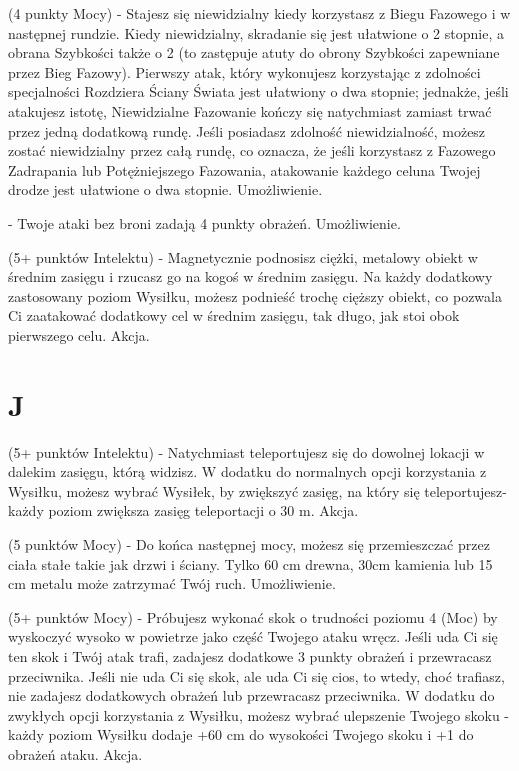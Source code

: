 { (4 punkty Mocy) - Stajesz się niewidzialny kiedy korzystasz z Biegu Fazowego i w następnej rundzie. Kiedy niewidzialny, skradanie się jest ułatwione o 2 stopnie, a obrana Szybkości także o 2 (to zastępuje atuty do obrony Szybkości zapewniane przez Bieg Fazowy). Pierwszy atak, który wykonujesz korzystając z zdolności specjalności Rozdziera Ściany Świata jest ułatwiony o dwa stopnie; jednakże, jeśli atakujesz istotę, Niewidzialne Fazowanie kończy się natychmiast zamiast trwać przez jedną dodatkową rundę. Jeśli posiadasz zdolność niewidzialność, możesz zostać niewidzialny przez całą rundę, co oznacza, że jeśli korzystasz z Fazowego Zadrapania lub Potężniejszego Fazowania, atakowanie każdego celuna Twojej drodze jest ułatwione o dwa stopnie. Umożliwienie. 

 - Twoje ataki bez broni zadają 4 punkty obrażeń. Umożliwienie. 

 (5+ punktów Intelektu) - Magnetycznie podnosisz ciężki, metalowy obiekt w średnim zasięgu i rzucasz go na kogoś w średnim zasięgu. Na każdy dodatkowy zastosowany poziom Wysiłku, możesz podnieść trochę cięższy obiekt, co pozwala Ci zaatakować dodatkowy cel w średnim zasięgu, tak długo, jak stoi obok pierwszego celu. Akcja. 

\section{J}

 (5+ punktów Intelektu) - Natychmiast teleportujesz się do dowolnej lokacji w dalekim zasięgu, którą widzisz. W dodatku do normalnych opcji korzystania z Wysiłku, możesz wybrać Wysiłek, by zwiększyć zasięg, na który się teleportujesz- każdy poziom zwiększa zasięg teleportacji o 30 m. Akcja.

 (5 punktów Mocy) - Do końca następnej mocy, możesz się przemieszczać przez ciała stałe takie jak drzwi i ściany. Tylko 60 cm drewna, 30cm kamienia lub 15 cm metalu może zatrzymać Twój ruch. Umożliwienie.

 (5+ punktów Mocy) - Próbujesz wykonać skok o trudności poziomu 4 (Moc) by wyskoczyć wysoko w powietrze jako część Twojego ataku wręcz. Jeśli uda Ci się ten skok i Twój atak trafi, zadajesz dodatkowe 3 punkty obrażeń i przewracasz przeciwnika. Jeśli nie uda Ci się skok, ale uda Ci się cios, to wtedy, choć trafiasz, nie zadajesz dodatkowych obrażeń lub przewracasz przeciwnika. W dodatku do zwykłych opcji korzystania z Wysiłku, możesz wybrać ulepszenie Twojego skoku - każdy poziom Wysiłku dodaje +60 cm do wysokości Twojego skoku i +1 do obrażeń ataku. Akcja.

}
